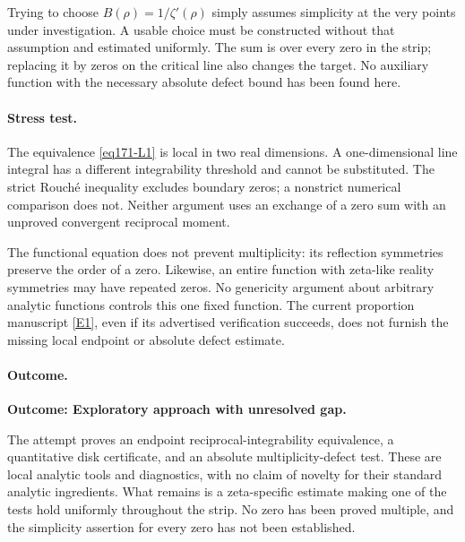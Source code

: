 \documentclass[11pt,a4paper]{article}
\newcommand{\eref}[2]{\hyperlink{extra:#1:#2}{[E#2]}}
\numberwithin{equation}{section}
\begin{document}
Trying to choose $B(\rho)=1/\zeta'(\rho)$ simply assumes simplicity at the
very points under investigation. A usable choice must be constructed
without that assumption and estimated uniformly. The sum is over every
zero in the strip; replacing it by zeros on the critical line also changes
the target. No auxiliary function with the necessary absolute defect bound
has been found here.

\paragraph{Stress test.}
The equivalence \eqref{eq171-L1} is local in two real dimensions. A
one-dimensional line integral has a different integrability threshold and
cannot be substituted. The strict Rouch\'e inequality excludes boundary
zeros; a nonstrict numerical comparison does not. Neither argument uses
an exchange of a zero sum with an unproved convergent reciprocal moment.

The functional equation does not prevent multiplicity: its reflection
symmetries preserve the order of a zero. Likewise, an entire function with
zeta-like reality symmetries may have repeated zeros. No genericity argument
about arbitrary analytic functions controls this one fixed function.
The current proportion manuscript \eref{30006766}{1}, even if its advertised
verification succeeds, does not furnish the missing local endpoint or
absolute defect estimate.

\paragraph{Outcome.}
\textbf{Outcome: Exploratory approach with unresolved gap.}

The attempt proves an endpoint reciprocal-integrability equivalence, a
quantitative disk certificate, and an absolute multiplicity-defect test.
These are local analytic tools and diagnostics, with no claim of novelty
for their standard analytic ingredients. What remains is a zeta-specific
estimate making one of the tests hold uniformly throughout the strip.
No zero has been proved multiple, and the simplicity assertion for every
zero has not been established.
\end{document}

